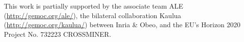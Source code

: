 \documentclass[sigplan, screen, letter]{acmart}
\begin{document}

\maketitle


\begin{acks}
	This work is partially supported by the associate team ALE (\url{http://gemoc.org/ale/}), the bilateral collaboration Kaulua (\url{http://gemoc.org/kaulua/}) between Inria \& Obeo, and the EU's Horizon 2020 Project No. 732223 CROSSMINER.
\end{acks} 

\clearpage
\balance



%
\end{document}
